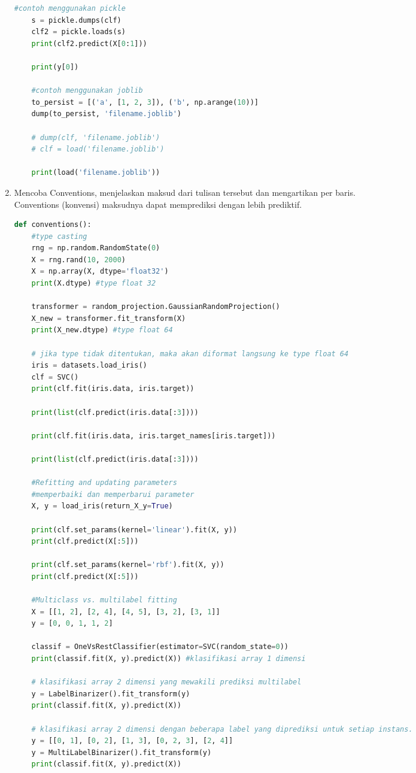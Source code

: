 \begin{enumerate}
\begin{lstlisting}[language=Python]
    #contoh menggunakan pickle
    s = pickle.dumps(clf)
    clf2 = pickle.loads(s)
    print(clf2.predict(X[0:1]))

    print(y[0])

    #contoh menggunakan joblib
    to_persist = [('a', [1, 2, 3]), ('b', np.arange(10))]
    dump(to_persist, 'filename.joblib')

    # dump(clf, 'filename.joblib')
    # clf = load('filename.joblib')

    print(load('filename.joblib'))
\end{lstlisting}

\item 
Mencoba Conventions, menjelaskan maksud dari tulisan tersebut dan mengartikan per baris.\\

Conventions (konvensi) maksudnya dapat memprediksi dengan lebih prediktif.\\

\begin{lstlisting}[language=Python]
def conventions():
    #type casting
    rng = np.random.RandomState(0)
    X = rng.rand(10, 2000)
    X = np.array(X, dtype='float32')
    print(X.dtype) #type float 32

    transformer = random_projection.GaussianRandomProjection()
    X_new = transformer.fit_transform(X)
    print(X_new.dtype) #type float 64

    # jika type tidak ditentukan, maka akan diformat langsung ke type float 64
    iris = datasets.load_iris()
    clf = SVC()
    print(clf.fit(iris.data, iris.target))

    print(list(clf.predict(iris.data[:3])))

    print(clf.fit(iris.data, iris.target_names[iris.target]))

    print(list(clf.predict(iris.data[:3])))

    #Refitting and updating parameters
    #memperbaiki dan memperbarui parameter
    X, y = load_iris(return_X_y=True)

    print(clf.set_params(kernel='linear').fit(X, y))
    print(clf.predict(X[:5]))

    print(clf.set_params(kernel='rbf').fit(X, y))
    print(clf.predict(X[:5]))

    #Multiclass vs. multilabel fitting
    X = [[1, 2], [2, 4], [4, 5], [3, 2], [3, 1]]
    y = [0, 0, 1, 1, 2]

    classif = OneVsRestClassifier(estimator=SVC(random_state=0))
    print(classif.fit(X, y).predict(X)) #klasifikasi array 1 dimensi

    # klasifikasi array 2 dimensi yang mewakili prediksi multilabel
    y = LabelBinarizer().fit_transform(y)
    print(classif.fit(X, y).predict(X))

    # klasifikasi array 2 dimensi dengan beberapa label yang diprediksi untuk setiap instans.
    y = [[0, 1], [0, 2], [1, 3], [0, 2, 3], [2, 4]]
    y = MultiLabelBinarizer().fit_transform(y)
    print(classif.fit(X, y).predict(X))
\end{lstlisting}

\end{enumerate}
